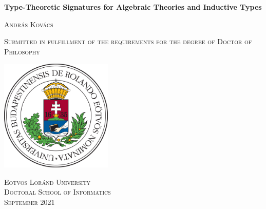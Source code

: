 \documentclass[12pt,a4paper,twoside,openany]{book}
\theoremstyle{remark}
\theoremstyle{definition}
\theoremstyle{theorem}
\begin{document}
\clearpage


\begin{titlepage}
    \begin{center}
        \vspace*{1cm}

        {\LARGE \textbf{Type-Theoretic Signatures for Algebraic Theories and Inductive Types}}

        \vspace{2em}

        {\Large \textsc{ András Kovács}}\\

        \vfill

        {\large \textsc{Submitted in fulfillment of the requirements
        for the degree of Doctor of Philosophy}}\\

        \vspace{0.8cm}

        \includegraphics[width=0.4\textwidth]{elte_cimer_szines}

        \large \textsc{
        Eötvös Loránd University\\
        Doctoral School of Informatics\\
        September 2021}

    \end{center}
\end{titlepage}



\thispagestyle{empty}

\frontmatter
\tableofcontents{}
\end{document}
